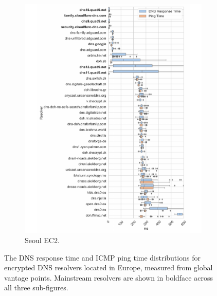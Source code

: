 \begin{figure}[h!]
\begin{subfigure}[b]{0.4\textwidth}
\includegraphics[width=\textwidth]{figures/seoul_eur.pdf}
\caption{Seoul EC2.}
\end{subfigure}
\caption{The DNS response time and ICMP ping time distributions for
    encrypted DNS resolvers located in Europe, measured from global vantage points.
    Mainstream resolvers are shown in boldface across all three
    sub-figures.}
\label{fig:dns-europe}
\end{figure}

